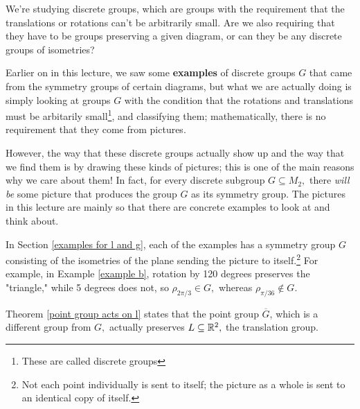\begin{question}%

We're studying discrete groups, which are groups with the requirement that the translations or rotations can't be arbitrarily small. Are we also requiring that they have to be groups preserving a given diagram, or can they be any discrete groups of isometries? 



\end{question}
\begin{ans}
Earlier on in this lecture, we saw some \textbf{examples} of discrete groups $G$ that came from the symmetry groups of certain diagrams, but what we are actually doing is simply looking at groups $G$ with the condition that the rotations and translations must be arbitarily small\footnote{These are called discrete groups}, and classifying them; mathematically, there is no requirement that they come from pictures. 

However, the way that these discrete groups actually show up and the way that we find them is by drawing these kinds of pictures; this is one of the main reasons why we care about them! In fact, for every discrete subgroup $G \subseteq M_2,$ there \emph{will be} some picture that produces the group $G$ as its symmetry group. The pictures in this lecture are mainly so that there are concrete examples to look at and think about. 

In Section \ref{examples for l and g}, each of the examples has a symmetry group $G$ consisting of the isometries of the plane sending the picture to itself.\footnote{Not each point individually is sent to itself; the picture as a whole is sent to an identical copy of itself.} For example, in Example \ref{example b}, rotation by 120 degrees preserves the "triangle," while 5 degrees does not, so $\rho_{2\pi/3} \in G,$ whereas $\rho_{\pi/36} \notin G.$ 


\end{ans}

Theorem \ref{point group acts on l} states that the point group $\overline{G}$, which is a different group from $G,$ actually preserves $L \subseteq \mathbb R^2,$ the translation group. 

